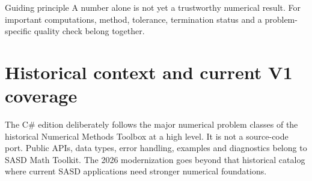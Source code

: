 \documentclass[11pt,a4paper,twoside,openright]{book}
\begin{document}
\begin{sasdtip}{Guiding principle}
A number alone is not yet a trustworthy numerical result. For important computations, method, tolerance, termination status and a problem-specific quality check belong together.
\end{sasdtip}

\tableofcontents
\clearpage
\mainmatter















\appendix
\chapter{Historical context and current V1 coverage}
The C\# edition deliberately follows the major numerical problem classes of the historical Numerical Methods Toolbox at a high level. It is not a source-code port. Public APIs, data types, error handling, examples and diagnostics belong to SASD Math Toolkit. The 2026 modernization goes beyond that historical catalog where current SASD applications need stronger numerical foundations.
\end{document}

